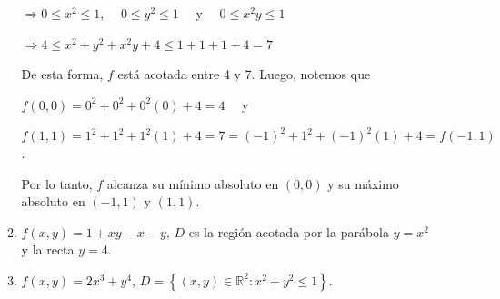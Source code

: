 \documentclass[fleqn, 12pt]{article}
\newcommand{\talque}{\; \middle | \;}
\begin{document}
\begin{enumerate}
\begin{enumerate}
            $ \Longrightarrow 0 \leq x^2 \leq 1 $, $ \quad 0 \leq y^2 \leq 1 \quad $ y $ \quad 0 \leq x^2 y \leq 1 $

            $ \Longrightarrow 4 \leq x^2 + y^2 + x^2 y + 4 \leq 1 + 1 + 1 + 4 = 7 $

            De esta forma, $ f $ está acotada entre 4 y 7. Luego, notemos que 
            
            $ f(0,0) = 0^2 + 0^2 + 0^2 (0) + 4 = 4 \quad $ y 
            
            $ f(1,1) = 1^2 + 1^2 + 1^2 (1) + 4 = 7 = (-1)^2 + 1^2 + (-1)^2 (1) + 4 = f(-1,1) $.

            Por lo tanto, $ f $ alcanza su mínimo absoluto en $ (0,0) $ y su máximo absoluto en $ (-1,1) $ y $ (1,1) $.

            \item $ f(x,y) = 1 + xy - x - y, \, D $ es la región acotada por la parábola $ y = x^2 $ y la recta $ y = 4 $.



            



            \item $ f(x,y) = 2x^3 + y^4, \, D = \left\lbrace (x,y) \in \mathbb{R}^2 : x^2 + y^2 \leq 1 \right\rbrace $.


\end{enumerate}
\end{enumerate}
\end{document}
